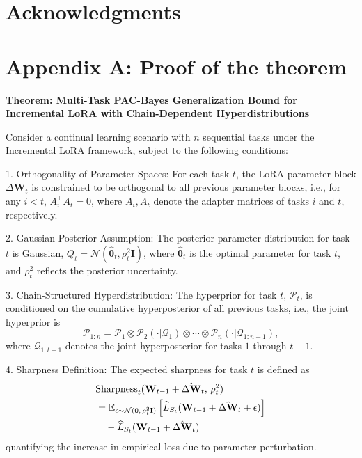 \documentclass[letterpaper]{article} %
\begin{document}
\section{Acknowledgments}





\appendix

\section{Appendix A: Proof of the theorem}

\textbf{Theorem: Multi-Task PAC-Bayes Generalization Bound for Incremental LoRA with Chain-Dependent Hyperdistributions}


Consider a continual learning scenario with $n$ sequential tasks under the Incremental LoRA framework, subject to the following conditions:

1. Orthogonality of Parameter Spaces: For each task $t$, the LoRA parameter block $\Delta\mathbf{W}_t$ is constrained to be orthogonal to all previous parameter blocks, i.e., for any $i < t$, $A_i^\top A_t = 0$, where $A_i, A_t$ denote the adapter matrices of tasks $i$ and $t$, respectively.

2. Gaussian Posterior Assumption: The posterior parameter distribution for task $t$ is Gaussian, $Q_t = \mathcal{N}(\hat{\boldsymbol{\theta}}_t, \rho_t^2 \mathbf{I})$, where $\hat{\boldsymbol{\theta}}_t$ is the optimal parameter for task $t$, and $\rho_t^2$ reflects the posterior uncertainty.

3. Chain-Structured Hyperdistribution: The hyperprior for task $t$, $\mathcal{P}_t$, is conditioned on the cumulative hyperposterior of all previous tasks, i.e., the joint hyperprior is
   $$
   \mathcal{P}_{1:n} = \mathcal{P}_1 \otimes \mathcal{P}_2(\cdot|\mathcal{Q}_1) \otimes \cdots \otimes \mathcal{P}_n(\cdot|\mathcal{Q}_{1:n-1}),
   $$ where $\mathcal{Q}_{1:t-1}$ denotes the joint hyperposterior for tasks $1$ through $t-1$.

4. Sharpness Definition: The expected sharpness for task $t$ is defined as
\begin{align}
&\mathrm{Sharpness}_t(\mathbf{W}_{t-1} + \hat{\Delta\mathbf{W}}_t,\, \rho_t^2) \notag\\
& = \mathbb{E}_{\epsilon \sim \mathcal{N}(0,\, \rho_t^2 \mathbf{I})}
\left[ \widehat{L}_{S_t}(\mathbf{W}_{t-1} + \hat{\Delta\mathbf{W}}_t + \epsilon) \right] \notag\\
&\quad - \widehat{L}_{S_t}(\mathbf{W}_{t-1} + \hat{\Delta\mathbf{W}}_t) \notag
\end{align}
quantifying the increase in empirical loss due to parameter perturbation.
\end{document}
